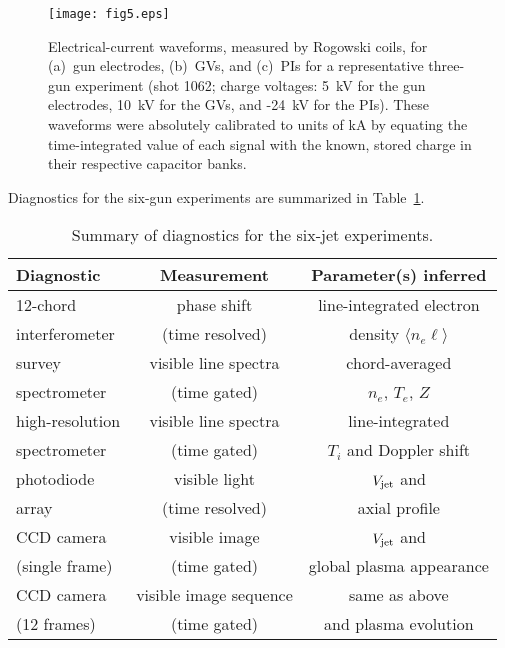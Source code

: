 \documentclass[journal]{IEEEtran}
\begin{document}
\begin{figure}[!tb]
\centering
\texttt{[image: fig5.eps]}
\caption{Electrical-current waveforms, measured by Rogowski coils,
for (a)~gun electrodes, (b)~GVs, and (c)~PIs for
a representative three-gun experiment (shot 1062; charge voltages: 5~kV
for the gun electrodes, 10~kV for the GVs, and -24~kV for the PIs).  These waveforms
were absolutely calibrated to units of kA by equating the time-integrated value of each signal with
the known, stored charge in their respective capacitor banks.}
\label{fig:currents}
\end{figure}

Diagnostics for the six-gun experiments are summarized in Table~\ref{table:diagnostics}\@.
\begin{table}[!tb]
\renewcommand{\arraystretch}{1.2}
\caption{Summary of diagnostics for the six-jet experiments.}
\label{table:diagnostics}
\centering
\begin{tabular}{lcc}
\hline\hline
Diagnostic & Measurement & Parameter(s) inferred \\
\hline
12-chord & phase shift & line-integrated electron\\
interferometer & (time resolved) & density $\langle n_e\ell\rangle$ \\
\hline
survey & visible line spectra & chord-averaged\\
spectrometer & (time gated) & $n_e$, $T_e$, $Z$\\
\hline
high-resolution & visible line spectra & line-integrated \\
spectrometer & (time gated) & $T_i$ and Doppler shift\\
\hline
photodiode & visible light & $V_{\rm jet}$ and\\
array & (time resolved) & axial profile\\
\hline
CCD camera & visible image & $V_{\rm jet}$ and\\
(single frame) & (time gated) & global plasma appearance\\
\hline
CCD camera & visible image sequence & same as above\\
(12 frames) & (time gated) & and plasma evolution\\
\hline\hline
\end{tabular}
\end{table}
\end{document}
